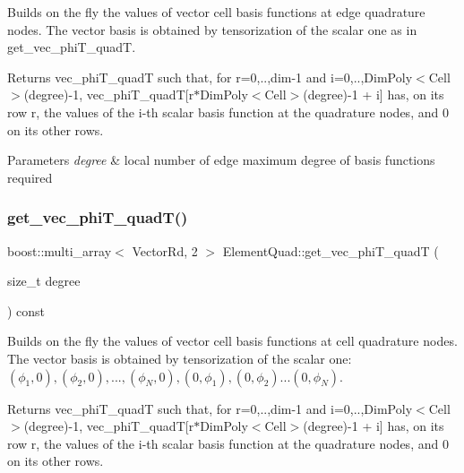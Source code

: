 Builds on the fly the values of vector cell basis functions at edge quadrature nodes. The vector basis is obtained by tensorization of the scalar one as in get\+\_\+vec\+\_\+phi\+T\+\_\+quadT. 

\begin{DoxyReturn}{Returns}
vec\+\_\+phi\+T\+\_\+quadT such that, for r=0,..,dim-\/1 and i=0,..,Dim\+Poly$<$\+Cell$>$(degree)-\/1, vec\+\_\+phi\+T\+\_\+quadT\mbox{[}r$\ast$\+Dim\+Poly$<$\+Cell$>$(degree)-\/1 + i\mbox{]} has, on its row r, the values of the i-\/th scalar basis function at the quadrature nodes, and 0 on its other rows. 
\end{DoxyReturn}

\begin{DoxyParams}{Parameters}
{\em degree} & local number of edge maximum degree of basis functions required \\
\hline
\end{DoxyParams}
\mbox{\label{classHArDCore2D_1_1ElementQuad_a3c549d43c0a5171d0c14f6b56ffc843d}} 
\subsubsection{\texorpdfstring{get\+\_\+vec\+\_\+phi\+T\+\_\+quad\+T()}{get\_vec\_phiT\_quadT()}}
{\footnotesize\ttfamily boost\+::multi\+\_\+array$<$ Vector\+Rd, 2 $>$ Element\+Quad\+::get\+\_\+vec\+\_\+phi\+T\+\_\+quadT (\begin{DoxyParamCaption}\item[{size\+\_\+t}]{degree }\end{DoxyParamCaption}) const}



Builds on the fly the values of vector cell basis functions at cell quadrature nodes. The vector basis is obtained by tensorization of the scalar one\+: $(\phi_1,0), (\phi_2,0), ..., (\phi_N,0), (0,\phi_1), (0,\phi_2) ... (0,\phi_N)$. 

\begin{DoxyReturn}{Returns}
vec\+\_\+phi\+T\+\_\+quadT such that, for r=0,..,dim-\/1 and i=0,..,Dim\+Poly$<$\+Cell$>$(degree)-\/1, vec\+\_\+phi\+T\+\_\+quadT\mbox{[}r$\ast$\+Dim\+Poly$<$\+Cell$>$(degree)-\/1 + i\mbox{]} has, on its row r, the values of the i-\/th scalar basis function at the quadrature nodes, and 0 on its other rows. 
\end{DoxyReturn}

